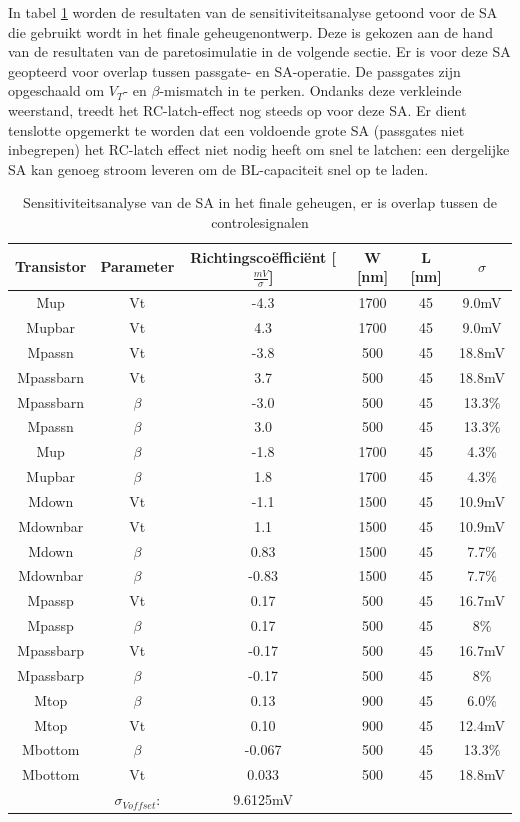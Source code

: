 In tabel \ref{tab:ourSA-sensanalysis-overlap} worden de resultaten van de sensitiviteitsanalyse getoond voor de SA die gebruikt wordt in het finale geheugenontwerp. Deze is gekozen aan de hand van de resultaten van de paretosimulatie in de volgende sectie. Er is voor deze SA geopteerd voor overlap tussen passgate- en SA-operatie. De passgates zijn opgeschaald om $V_{T}$- en $\beta$-mismatch in te perken. Ondanks deze verkleinde weerstand, treedt het RC-latch-effect nog steeds op voor deze SA. Er dient tenslotte opgemerkt te worden dat een voldoende grote SA (passgates niet inbegrepen) het RC-latch effect niet nodig heeft om snel te latchen: een dergelijke SA kan genoeg stroom leveren om de BL-capaciteit snel op te laden.


\begin{table}
\begin{tabular}{cccccc}
\hline 
Transistor & Parameter & Richtingscoëfficiënt [$\frac{mV}{\sigma}$] & W [nm] & L [nm] & $\sigma$ \\ 
\hline 
Mup & Vt & -4.3 & 1700 & 45 & 9.0mV \\ 
Mupbar & Vt & 4.3 & 1700 & 45 & 9.0mV \\ 
Mpassn & Vt & -3.8 & 500 & 45 & 18.8mV \\
Mpassbarn & Vt & 3.7 & 500 & 45 & 18.8mV \\
Mpassbarn & $\beta$ & -3.0 & 500 & 45 & 13.3\% \\ 
Mpassn & $\beta$ & 3.0 & 500 & 45 & 13.3\% \\ 
Mup & $\beta$ & -1.8 & 1700 & 45 & 4.3\% \\ 
Mupbar & $\beta$ & 1.8 & 1700 & 45 & 4.3\% \\ 
Mdown & Vt & -1.1 & 1500 & 45 & 10.9mV \\ 
Mdownbar & Vt & 1.1 & 1500 & 45 & 10.9mV \\
Mdown & $\beta$ & 0.83 & 1500 & 45 & 7.7\% \\
Mdownbar & $\beta$ & -0.83 & 1500 & 45 & 7.7\% \\  
Mpassp & Vt & 0.17 & 500 & 45 & 16.7mV \\ 
Mpassp & $\beta$ & 0.17 & 500 & 45 & 8\% \\ 
Mpassbarp & Vt & -0.17 & 500 & 45 & 16.7mV \\
Mpassbarp & $\beta$ & -0.17 & 500 & 45 & 8\% \\ 
Mtop & $\beta$ & 0.13 & 900 & 45 & 6.0\% \\ 
Mtop & Vt & 0.10 & 900 & 45 & 12.4mV \\ 
Mbottom & $\beta$ & -0.067 & 500 & 45 & 13.3\% \\ 
Mbottom & Vt & 0.033 & 500 & 45 & 18.8mV \\ 
\hline 
\hline & $\sigma_{Voffset}$: & 9.6125mV & & & \\
\hline
\end{tabular} 
\caption[Sensitiviteitsanalyse van de SA in het finale geheugen]{Sensitiviteitsanalyse van de SA in het finale geheugen, er is overlap tussen de controlesignalen}
\label{tab:ourSA-sensanalysis-overlap}
\end{table}


